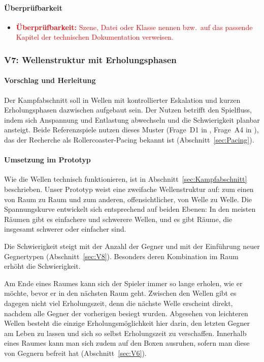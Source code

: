 \documentclass[../Main.tex]{subfiles}
\begin{document}
\paragraph{Überprüfbarkeit}
\begin{itemize}[leftmargin=1.5cm]
    \item \textcolor{red}{\textbf{Überprüfbarkeit:} Szene, Datei oder Klasse nennen bzw.\ auf das passende Kapitel der technischen Dokumentation verweisen.}
\end{itemize}

\subsubsection{V7: Wellenstruktur mit Erholungsphasen} \label{sec:V7}

\paragraph{Vorschlag und Herleitung}
Der Kampfabschnitt soll in Wellen mit kontrollierter Eskalation und kurzen Erholungsphasen dazwischen aufgebaut sein. Der Nutzen betrifft den Spielfluss, indem sich Anspannung und Entlastung abwechseln und die Schwierigkeit planbar ansteigt. Beide Referenzspiele nutzen dieses Muster (Frage~D1 in , Frage~A4 in ), das der Recherche als Rollercoaster-Pacing bekannt ist (Abschnitt~\ref{sec:Pacing}).

\paragraph{Umsetzung im Prototyp}
Wie die Wellen technisch funktionieren, ist in Abschnitt~\ref{sec:Kampfabschnitt} beschrieben. Unser Prototyp weist eine zweifache Wellenstruktur auf: zum einen von Raum zu Raum und zum anderen, offensichtlicher, von Welle zu Welle. Die Spannungskurve entwickelt sich entsprechend auf beiden Ebenen: In den meisten Räumen gibt es einfachere und schwerere Wellen, und es gibt Räume, die insgesamt schwerer oder einfacher sind.

Die Schwierigkeit steigt mit der Anzahl der Gegner und mit der Einführung neuer Gegnertypen (Abschnitt~\ref{sec:V8}). Besonders deren Kombination im Raum erhöht die Schwierigkeit.

Am Ende eines Raumes kann sich der Spieler immer so lange erholen, wie er möchte, bevor er in den nächsten Raum geht. Zwischen den Wellen gibt es dagegen nicht viel Erholungszeit, denn die nächste Welle erscheint direkt, nachdem alle Gegner der vorherigen besiegt wurden. Abgesehen von leichteren Wellen besteht die einzige Erholungsmöglichkeit hier darin, den letzten Gegner am Leben zu lassen und sich so selbst Erholungszeit zu verschaffen. Innerhalb eines Raumes kann man sich zudem auf den Boxen ausruhen, sofern man diese von Gegnern befreit hat (Abschnitt~\ref{sec:V6}).
\end{document}

